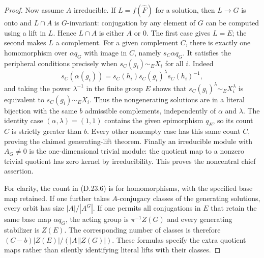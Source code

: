 \begin{proof}
Now assume $A$ irreducible.  If $L=f(\widehat F)$ for a solution,
then $L\to G$ is onto and $L\cap A$ is $G$-invariant: conjugation
by any element of $G$ can be computed using a lift in $L$.
Hence $L\cap A$ is either $A$ or $0$.  The first case gives $L=E$;
the second makes $L$ a complement.  For a given complement $C$,
there is exactly one homomorphism over $\alpha q_G$ with image
in $C$, namely $s_C\alpha q_G$.  It satisfies the peripheral
conditions precisely when $s_C(g_i)\sim_E X_i$ for all $i$.
Indeed
\[
 s_C(\alpha(g_i))=
 s_C(h_i)s_C(g_i)^\lambda s_C(h_i)^{-1},
\]
and taking the power $\lambda^{-1}$ in the finite group $E$
shows that $s_C(g_i)^\lambda\sim_E X_i^\lambda$ is equivalent
to $s_C(g_i)\sim_E X_i$.  Thus the nongenerating solutions are
in a literal bijection with the same $b$ admissible complements,
independently of $\alpha$ and $\lambda$.  The identity case
$(\alpha,\lambda)=(1,1)$ contains the given epimorphism $q_E$,
so its count $C$ is strictly greater than $b$.  Every other
nonempty case has this same count $C$, proving the claimed
generating-lift theorem.  Finally an irreducible module with
$A_G\ne0$ is the one-dimensional trivial module: the quotient
map to a nonzero trivial quotient has zero kernel by irreducibility.
This proves the noncentral chief assertion.

For clarity, the count in \textup{(D.23.6)} is for homomorphisms,
with the specified base map retained.  If one further takes
$A$-conjugacy classes of the generating solutions, every orbit
has size $|A|/|A^G|$.  If one permits all conjugations in $E$
that retain the same base map $\alpha q_G$, the acting group is
$\pi^{-1}Z(G)$ and every generating stabilizer is $Z(E)$.
The corresponding number of classes is therefore
$(C-b)|Z(E)|/(|A||Z(G)|)$.  These formulas specify the extra
quotient maps rather than silently identifying literal lifts with
their classes.


\end{proof}
